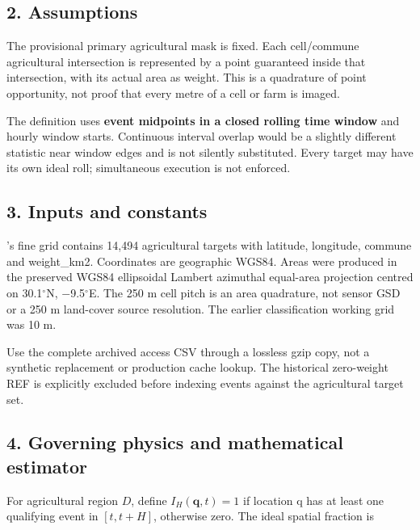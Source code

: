 \documentclass[10pt,a4paper]{article}
\numberwithin{equation}{section}
\begin{document}
\subsection*{2. Assumptions}
\begin{sloppypar}The provisional primary agricultural mask is fixed. Each cell/commune agricultural intersection is represented by a point guaranteed inside that intersection, with its actual area as weight. This is a quadrature of point opportunity, not proof that every metre of a cell or farm is imaged.\end{sloppypar}


\begin{sloppypar}The definition uses \textbf{event midpoints in a closed rolling time window} and hourly window starts. Continuous interval overlap would be a slightly different statistic near window edges and is not silently substituted. Every target may have its own ideal roll; simultaneous execution is not enforced.\end{sloppypar}


\subsection*{3. Inputs and constants}
\begin{sloppypar}\cite{S06}'s fine grid contains 14,494 agricultural targets with latitude, longitude, commune and weight\_km2. Coordinates are geographic WGS84. Areas were produced in the preserved WGS84 ellipsoidal Lambert azimuthal equal-area projection centred on 30.1\ensuremath{{}^{\circ}}N, \ensuremath{-}9.5\ensuremath{{}^{\circ}}E. The 250 m cell pitch is an area quadrature, not sensor GSD or a 250 m land-cover source resolution. The earlier classification working grid was 10 m.\end{sloppypar}


\begin{sloppypar}Use the complete archived access CSV through a lossless gzip copy, not a synthetic replacement or production cache lookup. The historical zero-weight REF is explicitly excluded before indexing events against the agricultural target set.\end{sloppypar}


\subsection*{4. Governing physics and mathematical estimator}
\begin{sloppypar}For agricultural region \(D\), define \(I_H(\mathbf q,t)=1\) if location q has at least one qualifying event in \([t,t+H]\), otherwise zero. The ideal spatial fraction is\end{sloppypar}
\end{document}
